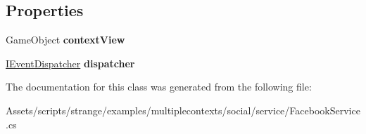 \subsection*{Properties}
\begin{DoxyCompactItemize}
\item 
\hypertarget{classstrange_1_1examples_1_1multiplecontexts_1_1social_1_1_facebook_service_ad0b0f939f202e43a652ac5c6a2a13f19}{Game\-Object {\bfseries context\-View}}\label{classstrange_1_1examples_1_1multiplecontexts_1_1social_1_1_facebook_service_ad0b0f939f202e43a652ac5c6a2a13f19}

\item 
\hypertarget{classstrange_1_1examples_1_1multiplecontexts_1_1social_1_1_facebook_service_a266d139f6800bb399034ae824e9f8a7b}{\hyperlink{interfacestrange_1_1extensions_1_1dispatcher_1_1eventdispatcher_1_1api_1_1_i_event_dispatcher}{I\-Event\-Dispatcher} {\bfseries dispatcher}}\label{classstrange_1_1examples_1_1multiplecontexts_1_1social_1_1_facebook_service_a266d139f6800bb399034ae824e9f8a7b}

\end{DoxyCompactItemize}


The documentation for this class was generated from the following file\-:\begin{DoxyCompactItemize}
\item 
Assets/scripts/strange/examples/multiplecontexts/social/service/Facebook\-Service.\-cs\end{DoxyCompactItemize}
